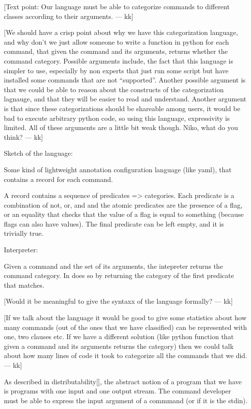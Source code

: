 \documentclass[sigplan,10pt,review,anonymous]{acmart}
\newcommand{\kk}[1]{[{\color{magenta}#1 --- kk}]}
\begin{document}
\kk{Text point: Our language must be able to categorize commands to
  different classes according to their arguments.}

\kk{We should have a crisp point about why we have this categorization
  language, and why don't we just allow someone to write a function in
  python for each command, that given the command and its arguments,
  returns whether the command category. Possible arguments include,
  the fact that this language is simpler to use, especially by non
  experts that just run some script but have installed some commands
  that are not ``supported''. Another possible argument is that we
  could be able to reason about the constructs of the categorization
  lagnauge, and that they will be easier to read and
  understand. Another argument is that since these categorizations
  should be shareable among users, it would be bad to execute
  arbitrary python code, so using this language, expressivity is
  limited. All of these arguments are a little bit weak though. Niko,
  what do you think?}

Sketch of the language:

Some kind of lightweight annotation configuration language (like
yaml), that contains a record for each command.

A record contains a sequence of predicates => categories. Each
predicate is a combination of not, or, and and the atomic predicates
are the presence of a flag, or an equality that checks that the value
of a flag is equal to something (because flags can also have
values). The final predicate can be left empty, and it is trivially true.

Interpreter:

Given a command and the set of its arguments, the intepreter returns
the command category. In does so by returning the category of the first
predicate that matches.

\kk{Would it be meaningful to give the syntaxx of the language
  formally?}

\kk{If we talk about the language it would be good to give some
  statistics about how many commands (out of the ones that we have
  classified) can be represented with one, two clauses etc. If we have
  a different solution (like python function that given a command and
  its arguments returns the category) then we could talk about how
  many lines of code it took to categorize all the commands that we
  did.}

As described in distributability\ref{}, the abstract notion of a
program that we have is programs with one input and one output
stream. The command developer must be able to express the input
argument of a commmand (or if it is the stdin).
\end{document}
